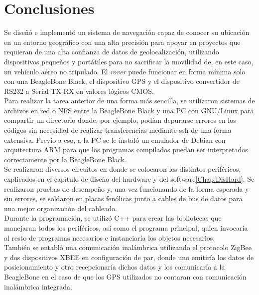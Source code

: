 
\chapter{Conclusiones} %

\label{Conc} %

Se diseñó e implementó un sistema de navegación capaz de conocer su ubicación en un entorno geográfico con una alta precisión para apoyar en proyectos que requieran de una alta confianza de datos de geolocalización, utilizando dispositivos pequeños y portátiles para no sacrificar la movilidad de, en este caso, un vehículo aéreo no tripulado. El \textit{rover} puede funcionar en forma mínima solo con una BeagleBone Black, el dispositivo GPS y el dispositivo convertidor de RS232 a Serial TX-RX en valores lógicos CMOS.\\

Para realizar la tarea anterior de una forma más sencilla, se utilizaron sistemas de archivos en red o NFS entre la BeagleBone Black y una PC con GNU/Linux para compartir un directorio donde, por ejemplo, podían depurarse errores en los códigos sin necesidad de realizar transferencias mediante ssh de una forma extensiva. Previo a eso, a la PC se le instaló un emulador de Debian con arquitectura ARM para que los programas compilados puedan ser interpretados correctamente por la BeagleBone Black.\\

Se realizaron diversos circuitos en donde se colocaron los distintos periféricos, explicados en el capítulo de diseño del hardware y del software\ref{Chap:DisHard}. Se realizaron pruebas de desempeño y, una vez funcionando de la forma esperada y sin errores, se soldaron en placas fenólicas junto a cables de bus de datos para una mejor organización del cableado.\\

Durante la programación, se utilizó C++ para crear las bibliotecas que manejaran todos los periféricos, así como el programa principal, quien invocaría al resto de programas necesarios e instanciaría los objetos necesarios.\\

También se entabló una comunicación inalámbrica utilizando el protocolo ZigBee y dos dispositivos XBEE en configuración de par, donde uno emitiría los datos de posicionamiento y otro recepcionaría dichos datos y los comunicaría a la BeagleBone en el caso de que los GPS utilizados no contaran con comunicación inalámbrica integrada.\\ 

